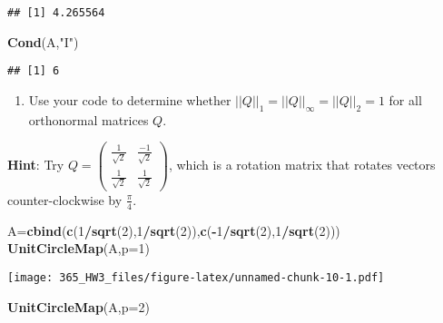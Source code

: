 \documentclass[]{article}
\newenvironment{Shaded}{\begin{snugshade}}{\end{snugshade}}
\newcommand{\DataTypeTok}[1]{\textcolor[rgb]{0.13,0.29,0.53}{#1}}
\newcommand{\DecValTok}[1]{\textcolor[rgb]{0.00,0.00,0.81}{#1}}
\newcommand{\KeywordTok}[1]{\textcolor[rgb]{0.13,0.29,0.53}{\textbf{#1}}}
\newcommand{\NormalTok}[1]{#1}
\newcommand{\OperatorTok}[1]{\textcolor[rgb]{0.81,0.36,0.00}{\textbf{#1}}}
\newcommand{\StringTok}[1]{\textcolor[rgb]{0.31,0.60,0.02}{#1}}
\providecommand{\tightlist}{%
  \setlength{\itemsep}{0pt}\setlength{\parskip}{0pt}}
\begin{document}
\begin{verbatim}
## [1] 4.265564
\end{verbatim}

\begin{Shaded}
\begin{Highlighting}[]
\KeywordTok{Cond}\NormalTok{(A,}\StringTok{"I"}\NormalTok{)}
\end{Highlighting}
\end{Shaded}

\begin{verbatim}
## [1] 6
\end{verbatim}

\begin{enumerate}
\def\labelenumi{(\alph{enumi})}
\setcounter{enumi}{2}
\tightlist
\item
  Use your code to determine whether
  \(||Q||_1=||Q||_{\infty}=||Q||_2=1\) for all orthonormal matrices
  \(Q\).
\end{enumerate}

\textbf{Hint}: Try
\(Q=\begin{pmatrix} \frac{1}{\sqrt{2}} & \frac{-1}{\sqrt{2}} \\ \frac{1}{\sqrt{2}} & \frac{1}{\sqrt{2}} \end{pmatrix}\),
which is a rotation matrix that rotates vectors counter-clockwise by
\(\frac{\pi}{4}\).

\begin{Shaded}
\begin{Highlighting}[]
\NormalTok{A=}\KeywordTok{cbind}\NormalTok{(}\KeywordTok{c}\NormalTok{(}\DecValTok{1}\OperatorTok{/}\KeywordTok{sqrt}\NormalTok{(}\DecValTok{2}\NormalTok{),}\DecValTok{1}\OperatorTok{/}\KeywordTok{sqrt}\NormalTok{(}\DecValTok{2}\NormalTok{)),}\KeywordTok{c}\NormalTok{(}\OperatorTok{-}\DecValTok{1}\OperatorTok{/}\KeywordTok{sqrt}\NormalTok{(}\DecValTok{2}\NormalTok{),}\DecValTok{1}\OperatorTok{/}\KeywordTok{sqrt}\NormalTok{(}\DecValTok{2}\NormalTok{)))}
\KeywordTok{UnitCircleMap}\NormalTok{(A,}\DataTypeTok{p=}\DecValTok{1}\NormalTok{)}
\end{Highlighting}
\end{Shaded}

\texttt{[image: 365\_HW3\_files/figure-latex/unnamed-chunk-10-1.pdf]}

\begin{Shaded}
\begin{Highlighting}[]
\KeywordTok{UnitCircleMap}\NormalTok{(A,}\DataTypeTok{p=}\DecValTok{2}\NormalTok{)}
\end{Highlighting}
\end{Shaded}
\end{document}
